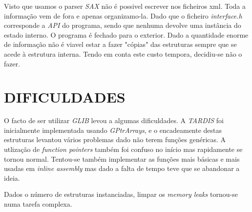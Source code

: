 \documentclass[letterpaper, 10 pt, conference]{IEEEtran}  %
\begin{document}
Visto que usamos o parser \textit{SAX} não é possivel escrever nos ficheiros xml. Toda a informação vem de fora e apenas organizamo-la. Dado que o ficheiro \textit{interface.h} corresponde a \textit{API} do programa, sendo que nenhuma devolve uma instância do estado interno.
O programa é fechado para o exterior.
Dado a quantidade enorme de informação não é viavel estar a fazer "cópias" das estruturas sempre que se acede à estrutura interna. Tendo em conta este custo tempora, decidiu-se não o fazer.


\section{DIFICULDADES}

O facto de ser utilizar \textit{GLIB} levou a algumas dificuldades. A \textit{TARDIS} foi inicialmente implementada usando \textit{GPtrArrays}, e o encadeamente destas estruturas levantou vários problemas dado não terem funções genéricas.
A utlização de \textit{function pointers} também foi confuso no início mas rapidamente se tornou normal. Tentou-se também implementar as funções mais básicas e mais usadas em \textit{inline assembly} mas dado a falta de tempo teve que se abandonar a ideia.

Dados o número de estruturas instanciadas, limpar os \textit{memory leaks} tornou-se numa tarefa complexa.



\addtolength{\textheight}{-12cm}   %







\end{document}
